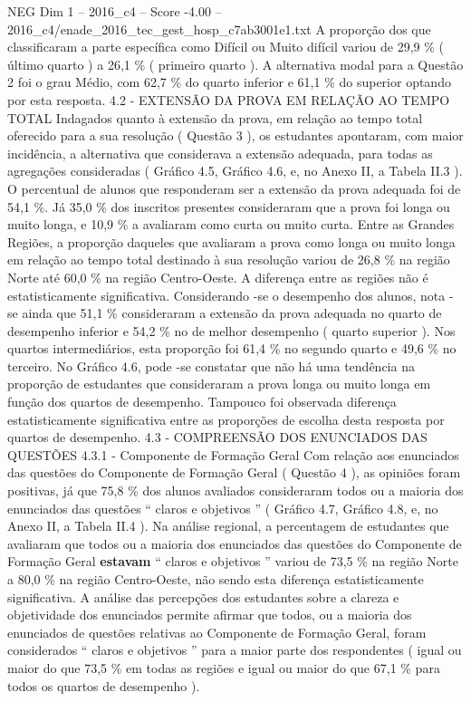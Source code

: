 \begin{textsample}{NEG Dim 1 – 2016\_c4 – Score -4.00 – 2016\_c4/enade\_2016\_tec\_gest\_hosp\_c7ab3001e1.txt}
A proporção dos que classificaram a parte específica como Difícil ou Muito difícil variou de 29,9 \% ( último quarto ) a 26,1 \% ( primeiro quarto ).
A alternativa modal para a Questão 2 foi o grau Médio, com 62,7 \% do quarto inferior e 61,1 \% do superior optando por esta resposta. 4.2 - EXTENSÃO DA PROVA EM RELAÇÃO AO TEMPO TOTAL Indagados quanto à extensão da prova, em relação ao tempo total oferecido para a sua resolução ( Questão 3 ), os estudantes apontaram, com maior incidência, a alternativa que considerava a extensão adequada, para todas as agregações consideradas ( Gráfico 4.5, Gráfico 4.6, e, no Anexo II, a Tabela II.3 ).
O percentual de alunos que responderam ser a extensão da prova adequada foi de 54,1 \%.
Já 35,0 \% dos inscritos presentes consideraram que a prova foi longa ou muito longa, e 10,9 \% a avaliaram como curta ou muito curta.
Entre as Grandes Regiões, a proporção daqueles que avaliaram a prova como longa ou muito longa em relação ao tempo total destinado à sua resolução variou de 26,8 \% na região Norte até 60,0 \% na região Centro-Oeste.
A diferença entre as regiões não é estatisticamente significativa.
Considerando -se o desempenho dos alunos, nota -se ainda que 51,1 \% consideraram a extensão da prova adequada no quarto de desempenho inferior e 54,2 \% no de melhor desempenho ( quarto superior ).
Nos quartos intermediários, esta proporção foi 61,4 \% no segundo quarto e 49,6 \% no terceiro.
No Gráfico 4.6, pode -se constatar que não há uma tendência na proporção de estudantes que consideraram a prova longa ou muito longa em função dos quartos de desempenho.
Tampouco foi observada diferença estatisticamente significativa entre as proporções de escolha desta resposta por quartos de desempenho. 4.3 - COMPREENSÃO DOS ENUNCIADOS DAS QUESTÕES 4.3.1 - Componente de Formação Geral Com relação aos enunciados das questões do Componente de Formação Geral ( Questão 4 ), as opiniões foram positivas, já que 75,8 \% dos alunos avaliados consideraram todos ou a maioria dos enunciados das questões “ claros e objetivos ” ( Gráfico 4.7, Gráfico 4.8, e, no Anexo II, a Tabela II.4 ).
Na análise regional, a percentagem de estudantes que avaliaram que todos ou a maioria dos enunciados das questões do Componente de Formação Geral \textbf{estavam} “ claros e objetivos ” variou de 73,5 \% na região Norte a 80,0 \% na região Centro-Oeste, não sendo esta diferença estatisticamente significativa.
A análise das percepções dos estudantes sobre a clareza e objetividade dos enunciados permite afirmar que todos, ou a maioria dos enunciados de questões relativas ao Componente de Formação Geral, foram considerados “ claros e objetivos ” para a maior parte dos respondentes ( igual ou maior do que 73,5 \% em todas as regiões e igual ou maior do que 67,1 \% para todos os quartos de desempenho ).

\end{textsample}
